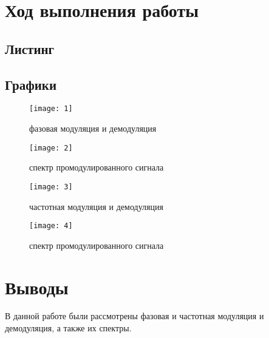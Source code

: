 \section{Ход выполнения работы}

\subsection{Листинг}


\parindent=1cm %

\subsection{Графики}

\begin{figure}[H]
	\begin{center}
		\texttt{[image: 1]}
		\caption{фазовая модуляция и демодуляция} 
		\label{pic:triangle_spectrum} %
	\end{center}
\end{figure}

\begin{figure}[H]
	\begin{center}
		\texttt{[image: 2]}
		\caption{спектр промодулированного сигнала} 
		\label{pic:triangle_spectrum} %
	\end{center}
\end{figure}

\begin{figure}[H]
	\begin{center}
		\texttt{[image: 3]}
		\caption{частотная модуляция и демодуляция} 
		\label{pic:triangle_spectrum} %
	\end{center}
\end{figure}

\begin{figure}[H]
	\begin{center}
		\texttt{[image: 4]}
		\caption{спектр промодулированного сигнала} 
		\label{pic:triangle_spectrum} %
	\end{center}
\end{figure}

\section{Выводы}
В данной работе были рассмотрены фазовая и частотная модуляция и демодуляция, а также их спектры. 

